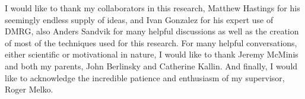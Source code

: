 I would like to thank my collaborators in this research, Matthew Hastings for his seemingly endless supply of ideas, and Ivan Gonzalez for his expert use of DMRG, also Anders Sandvik for many helpful discussions as well as the creation of most of the techniques used for this research.
For many helpful conversations, either scientific or motivational in nature, I would like to thank Jeremy McMinis and both my parents, John Berlinsky and Catherine Kallin.
And finally, I would like to acknowledge the incredible patience and enthusiasm of my supervisor, Roger Melko.
\cleardoublepage

%
%

\tableofcontents
\cleardoublepage


\listoffigures
{}
\cleardoublepage



